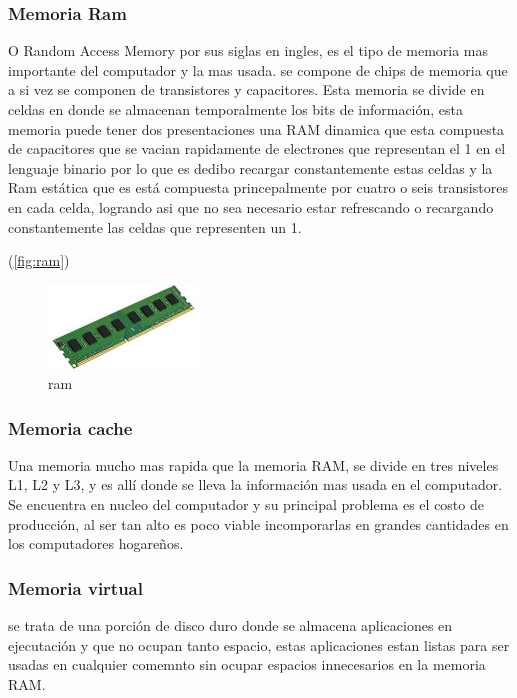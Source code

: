 \documentclass{article}
\begin{document}
        \subsubsection{Memoria Ram}
        O Random Access Memory por sus siglas en ingles, es el tipo de memoria mas importante del computador y la mas usada. se compone de chips de memoria que a si vez se componen de transistores y capacitores. Esta memoria se divide en celdas en donde se almacenan temporalmente los bits de información, esta memoria puede tener dos presentaciones una RAM dinamica que esta compuesta de capacitores que se vacian rapidamente de electrones que representan el 1 en el lenguaje binario por lo que es dedibo recargar constantemente estas celdas y la Ram estática que es está compuesta princepalmente por cuatro o seis transistores en cada celda, logrando asi que no sea necesario estar refrescando o recargando constantemente las celdas que representen un 1.
        
        (\ref{fig:ram})
        \begin{figure}[h]
        \includegraphics[width=4cm]{ram.jpg}
        \centering
        \caption{ram}
        \label{fig:Memoria RAM}
        \end{figure}    
        
        
        \subsubsection{Memoria cache}
        Una memoria mucho mas rapida que la memoria RAM, se divide en tres niveles L1, L2 y L3, y es allí donde se lleva la información mas usada en el computador. Se encuentra en nucleo del computador y su principal problema es el costo de producción, al ser tan alto es poco viable incomporarlas en grandes cantidades en los computadores hogareños.   
        
        \subsubsection{Memoria virtual}
        se trata de una porción de disco duro donde se almacena aplicaciones en ejecutación y que no ocupan tanto espacio, estas aplicaciones estan listas para ser usadas en cualquier comemnto sin ocupar espacios innecesarios en la memoria RAM.  
        
\end{document}
